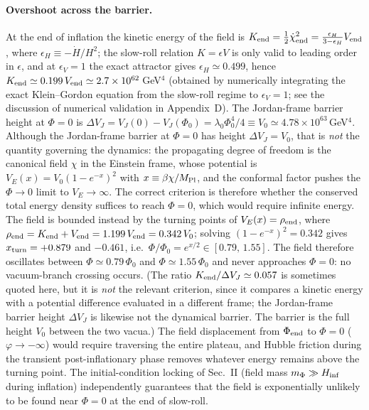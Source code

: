 \documentclass[pdflatex,sn-mathphys-num]{sn-jnl}
\newcommand{\MP}{M_{\rm Pl}}
\newcommand{\PhiV}{\Phi_0}
\theoremstyle{thmstyleone}
\begin{document}
\paragraph{Overshoot across the barrier.} At the end of inflation the kinetic energy of the field is $K_{\rm end}=\frac12\dot\chi_{\rm end}^2=\frac{\epsilon_H}{3-\epsilon_H}V_{\rm end}$, where $\epsilon_H\equiv-\dot H/H^2$; the slow-roll relation $K=\epsilon V$ is only valid to leading order in $\epsilon$, and at $\epsilon_V=1$ the exact attractor gives $\epsilon_H\simeq0.499$, hence $K_{\rm end}\simeq0.199\,V_{\rm end}\simeq2.7\times10^{62}\,$GeV$^4$ (obtained by numerically integrating the exact Klein--Gordon equation from the slow-roll regime to $\epsilon_V=1$; see the discussion of numerical validation in Appendix~D). The Jordan-frame barrier height at $\Phi=0$ is $\Delta V_J=V_J(0)-V_J(\PhiV)=\lambda_0\PhiV^4/4\equiv V_0\simeq4.78\times10^{63}\,$GeV$^4$. Although the Jordan-frame barrier at $\Phi=0$ has height $\Delta V_J=V_0$, that is \emph{not} the quantity governing the dynamics: the propagating degree of freedom is the canonical field $\chi$ in the Einstein frame, whose potential is $V_E(x)=V_0(1-e^{-x})^2$ with $x\equiv\beta\chi/\MP$, and the conformal factor pushes the $\Phi\to0$ limit to $V_E\to\infty$. The correct criterion is therefore whether the conserved total energy density suffices to reach $\Phi=0$, which would require infinite energy. The field is bounded instead by the turning points of $V_E(x)=\rho_{\rm end}$, where $\rho_{\rm end}=K_{\rm end}+V_{\rm end}=1.199\,V_{\rm end}=0.342\,V_0$; solving $(1-e^{-x})^2=0.342$ gives $x_{\rm turn}=+0.879$ and $-0.461$, i.e.\ $\Phi/\PhiV=e^{x/2}\in[0.79,\,1.55]$. The field therefore oscillates between $\Phi\simeq0.79\,\PhiV$ and $\Phi\simeq1.55\,\PhiV$ and never approaches $\Phi=0$: no vacuum-branch crossing occurs. (The ratio $K_{\rm end}/\Delta V_J\simeq0.057$ is sometimes quoted here, but it is \emph{not} the relevant criterion, since it compares a kinetic energy with a potential difference evaluated in a different frame; the Jordan-frame barrier height $\Delta V_J$ is likewise not the dynamical barrier. The barrier is the full height $V_0$ between the two vacua.) The field displacement from $\Phi_{\rm end}$ to $\Phi=0$ ($\varphi\to-\infty$) would require traversing the entire plateau, and Hubble friction during the transient post-inflationary phase removes whatever energy remains above the turning point. The initial-condition locking of Sec.~II (field mass $m_\Phi\gg H_{\rm inf}$ during inflation) independently guarantees that the field is exponentially unlikely to be found near $\Phi=0$ at the end of slow-roll.
\end{document}
